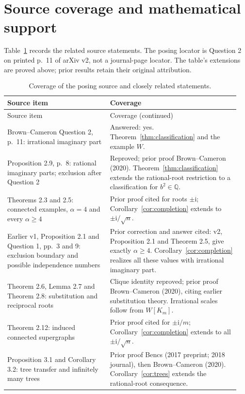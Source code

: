\documentclass[11pt]{article}
\newcommand{\ii}{\mathrm{i}}
\begin{document}
\section{Source coverage and mathematical support}
Table~\ref{tab:coverage} records the related source statements.
The posing locator is Question 2 on printed p.~11 of arXiv v2, not a
journal-page locator. The table's extensions are proved above; prior
results retain their original attribution.
\small
\begin{longtable}{@{}p{0.42\linewidth}p{0.53\linewidth}@{}}
\caption{Coverage of the posing source and closely related statements.}\label{tab:coverage}\\
\toprule Source item & Coverage\\\midrule\endfirsthead
\toprule Source item & Coverage (continued)\\\midrule\endhead
\bottomrule\endfoot
Brown--Cameron Question 2, p.~11: irrational imaginary part
 & Answered: yes. Theorem~\ref{thm:classification} and the example $W$.\\[4pt]
Proposition 2.9, p.~8: rational imaginary parts; exclusion after Question 2
 & Reproved; prior proof Brown--Cameron (2020). Theorem~\ref{thm:classification}
 extends the rational-root restriction to a classification for $b^2\in\mathbb Q$.\\[4pt]
Theorems 2.3 and 2.5: connected examples, $\alpha=4$ and every $\alpha\geq4$
 & Prior proof cited for roots $\pm\ii$; Corollary~\ref{cor:completion}
 extends to $\pm\ii/\sqrt n$.\\[4pt]
Earlier v1, Proposition 2.1 and Question 1, pp.~3 and 9:
 exclusion boundary and possible independence numbers
 & Prior correction and answer cited: v2, Proposition 2.1 and Theorem 2.5,
 give exactly $\alpha\geq4$. Corollary~\ref{cor:completion} realizes all
 these values with irrational imaginary part.\\[4pt]
Theorem 2.6, Lemma 2.7 and Theorem 2.8: substitution and reciprocal roots
 & Clique identity reproved; prior proof Brown--Cameron (2020), citing
 earlier substitution theory. Irrational scales follow from $W[K_m]$.\\[4pt]
Theorem 2.12: induced connected supergraphs
 & Prior proof cited for $\pm\ii/m$; Corollary~\ref{cor:completion}
 extends to all $\pm\ii/\sqrt n$.\\[4pt]
Proposition 3.1 and Corollary 3.2: tree transfer and infinitely many trees
 & Prior proof Bencs (2017 preprint; 2018 journal), then Brown--Cameron
 (2020). Corollary~\ref{cor:trees} extends the rational-root consequence.\\[4pt]

\end{longtable}
\end{document}
